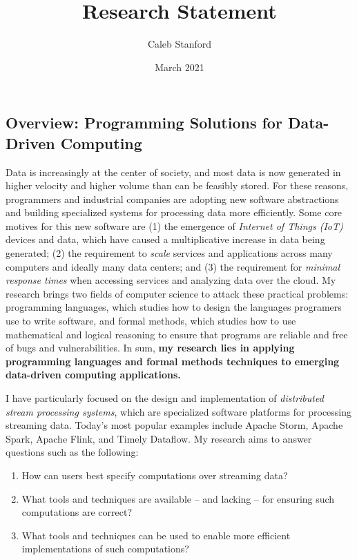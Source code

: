 \documentclass{article}
\title{Research Statement}
\author{Caleb Stanford}
\date{March 2021}
\begin{document}
\maketitle{}

\subsection*{Overview: Programming Solutions for Data-Driven Computing}

Data is increasingly at the center of society, and most data is now generated in higher velocity and higher volume than can be feasibly stored.
For these reasons, programmers and industrial companies are adopting new software abstractions
and building specialized systems for processing data more efficiently.
Some core motives for this new software are (1) the emergence of \emph{Internet of Things (IoT)} devices and data, which have caused a multiplicative increase in data being generated; (2) the requirement to \emph{scale} services and applications across many computers and ideally many data centers; and (3)
the requirement for \emph{minimal response times} when accessing services and analyzing data over the cloud.
My research brings two fields of computer science to attack these practical problems: programming languages, which studies how to design the languages programers use to write software, and formal methods, which studies how to use mathematical and logical reasoning to ensure that programs are reliable and free of bugs and vulnerabilities.
In sum,
\textbf{my research lies in applying programming languages and formal methods techniques to emerging data-driven computing applications.}

I have particularly focused on the design and implementation of \emph{distributed stream processing systems}, which are specialized software platforms for processing streaming data. Today's most popular examples include Apache Storm, Apache Spark, Apache Flink, and Timely Dataflow.
My research aims to answer questions such as the following:
\begin{enumerate}
\item How can users best specify computations over streaming data?
\item What tools and techniques are available -- and lacking -- for ensuring such computations are correct?
\item What tools and techniques can be used to enable more efficient implementations of such computations?
\end{enumerate}
\end{document}
